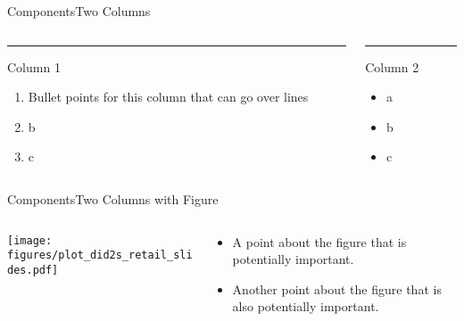 \documentclass[aspectratio=169,t,11pt,table]{beamer}
\begin{document}
\begin{frame}{Components}{Two Columns}
  \begin{columns}[T]
    \begin{column}{.50\textwidth}
      \vspace{0pt}
      {\color{accent}\rule{\linewidth}{2pt}}
      Column 1

      \begin{enumerate}
        \item Bullet points for this column that can go over lines
        \item b
        \item c
      \end{enumerate}
    \end{column}
    
    \hfill
    
    \begin{column}{.50\textwidth}
      {\color{accent}\rule{\linewidth}{2pt}}
      Column 2

      \begin{itemize}
        \item a
        \item b
        \item c
      \end{itemize}
    \end{column}
  \end{columns}
\end{frame}

\begin{frame}{Components}{Two Columns with Figure}
  \begin{columns}[T]
    \begin{column}{.6\textwidth}
      \texttt{[image: figures/plot\_did2s\_retail\_slides.pdf]}
    \end{column}
    \hfill
    \begin{column}{.4\textwidth}
      \begin{itemize}
      \item A point about the figure that is potentially important.
      \item Another point about the figure that is also potentially important.
      \end{itemize}
    \end{column}
  \end{columns}
\end{frame}

\end{document}
